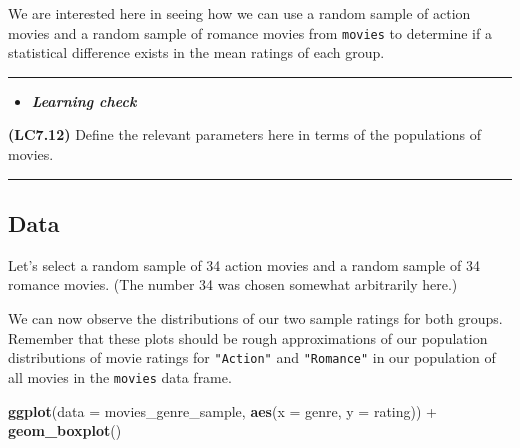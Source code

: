 \documentclass[]{tufte-book}
\newenvironment{Shaded}{\begin{snugshade}}{\end{snugshade}}
\newcommand{\KeywordTok}[1]{\textcolor[rgb]{0.13,0.29,0.53}{\textbf{{#1}}}}
\newcommand{\DataTypeTok}[1]{\textcolor[rgb]{0.13,0.29,0.53}{{#1}}}
\newcommand{\DecValTok}[1]{\textcolor[rgb]{0.00,0.00,0.81}{{#1}}}
\newcommand{\StringTok}[1]{\textcolor[rgb]{0.31,0.60,0.02}{{#1}}}
\newcommand{\NormalTok}[1]{{#1}}
\let\oldrule=\rule
\renewcommand{\rule}[1]{\oldrule{\linewidth}}
\newenvironment{rmdblock}[1]
  {\begin{shaded*}
  \begin{itemize}
  \renewcommand{\labelitemi}{
    \raisebox{-.7\height}[0pt][0pt]{
    }
  }
  \item
  }
  {
  \end{itemize}
  \end{shaded*}
  }
\newenvironment{learncheck}
  {\begin{rmdblock}{warning}}
  {\end{rmdblock}}
\theoremstyle{definition}
\theoremstyle{definition}
\theoremstyle{remark}
\begin{document}
We are interested here in seeing how we can use a random sample of
action movies and a random sample of romance movies from \texttt{movies}
to determine if a statistical difference exists in the mean ratings of
each group.

\begin{center}\rule{0.5\linewidth}{\linethickness}\end{center}

\begin{learncheck}
\textbf{\emph{Learning check}}
\end{learncheck}

\textbf{(LC7.12)} Define the relevant parameters here in terms of the
populations of movies.

\begin{center}\rule{0.5\linewidth}{\linethickness}\end{center}

\subsection{Data}\label{data-1}

Let's select a random sample of 34 action movies and a random sample of
34 romance movies. (The number 34 was chosen somewhat arbitrarily here.)

\begin{Shaded}
\end{Shaded}

We can now observe the distributions of our two sample ratings for both
groups. Remember that these plots should be rough approximations of our
population distributions of movie ratings for \texttt{"Action"} and
\texttt{"Romance"} in our population of all movies in the
\texttt{movies} data frame.

\begin{Shaded}
\begin{Highlighting}[]
\KeywordTok{ggplot}\NormalTok{(}\DataTypeTok{data =} \NormalTok{movies_genre_sample, }\KeywordTok{aes}\NormalTok{(}\DataTypeTok{x =} \NormalTok{genre, }\DataTypeTok{y =} \NormalTok{rating)) +}
\StringTok{  }\KeywordTok{geom_boxplot}\NormalTok{()}
\end{Highlighting}
\end{Shaded}
\end{document}

